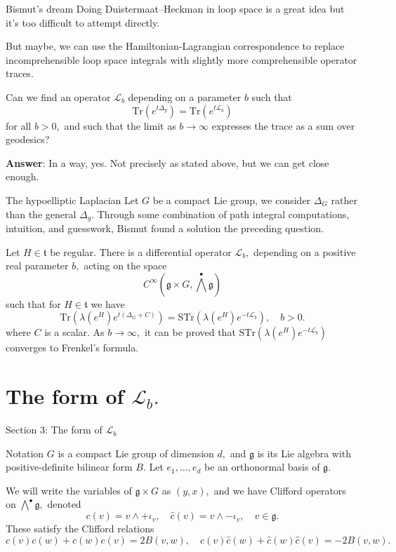 \documentclass{beamer}
\numberwithin{equation}{section}
\theoremstyle{plain}
\theoremstyle{plain}
\theoremstyle{definition}
\theoremstyle{plain}
\theoremstyle{plain}
\theoremstyle{definition}
\newcommand{\Lc}{\mathcal{L}}
\newcommand{\Tr}{\mathrm{Tr}}
\newcommand{\gf}{\mathfrak{g}}
\newcommand{\tf}{\mathfrak{t}}
\newcommand{\Str}{\mathrm{STr}}
\begin{document}
\begin{frame}{Bismut's dream}
  Doing Duistermaat--Heckman in loop space is a great idea but it's too difficult to attempt directly.
  
  But maybe, we can use the Hamiltonian-Lagrangian correspondence to replace incomprehensible loop space integrals with slightly more comprehensible operator traces.
  \begin{center}
    Can we find an operator $\Lc_b$ depending on a parameter $b$ such that
    \[
      \Tr(e^{t\Delta_g}) = \Tr(e^{t\Lc_b})
    \]
    for all $b>0,$ and such that the limit as $b\to\infty$ expresses the trace as a sum over geodesics?
  \end{center}
  \textbf{Answer}: In a way, yes. Not precisely as stated above, but we can get close enough.
\end{frame}

\begin{frame}{The hypoelliptic Laplacian}
  Let $G$ be a compact Lie group, we consider $\Delta_G$ rather than the general $\Delta_g.$ Through some combination of path integral computations, intuition, and guesswork, Bismut found a solution the preceding question.
  \begin{theorem}[Bismut (2011)]
    Let $H\in \tf$ be regular. There is a differential operator $\Lc_{b},$ depending on a positive real parameter $b,$ acting on the space
    \[
      C^\infty(\gf\times G,\bigwedge^{\bullet}\gf)
    \]
    such that for $H \in \tf$ we have
    \[
       \Tr(\lambda(e^H)e^{t(\Delta_G+C)}) = \Str(\lambda(e^H)e^{-t\Lc_{b}}),\quad b>0.
    \]
    where $C$ is a scalar.
    As $b\to\infty,$ it can be proved that $\Str(\lambda(e^H)e^{-t\Lc_{b}})$ converges to Frenkel's formula.
  \end{theorem}
\end{frame}

\section{The form of $\Lc_b.$}

\begin{frame}
  \huge{Section 3: The form of $\Lc_b$}
\end{frame}

\begin{frame}{Notation}
  $G$ is a compact Lie group of dimension $d,$ and $\gf$ is its Lie algebra with positive-definite bilinear form $B$. Let $e_1,\ldots,e_d$ be an orthonormal basis of $\gf.$
  
  We will write the variables of $\gf\times G$ as $(y,x),$ and we have Clifford operators on $\bigwedge^{\bullet}\gf,$ denoted
  \[
    c(v) = v\wedge + \iota_v,\quad \widehat{c}(v) = v\wedge -\iota_v,\quad v \in \gf.
  \]
  These satisfy the Clifford relations
  \[
    c(v)c(w)+c(w)c(v) = 2B(v,w),\quad \widehat{c}(v)\widehat{c}(w)+\widehat{c}(w)\widehat{c}(v) = -2B(v,w).
  \]
\end{frame}
\end{document}
